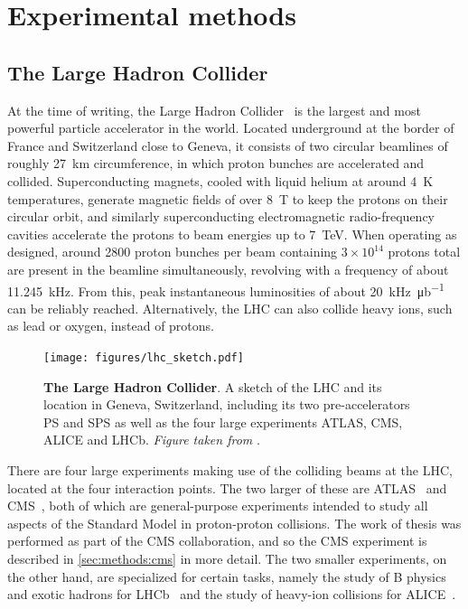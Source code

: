 \chapter{Experimental methods}
\label{ch:methods}

\section{The Large Hadron Collider}

At the time of writing, the Large Hadron Collider~\cite{Bruning:2004ej} is the largest and most powerful particle accelerator in the world. Located underground at the border of France and Switzerland close to Geneva, it consists of two circular beamlines of roughly 27~km circumference, in which proton bunches are accelerated and collided. Superconducting magnets, cooled with liquid helium at around 4~K temperatures, generate magnetic fields of over 8~T to keep the protons on their circular orbit, and similarly superconducting electromagnetic radio-frequency cavities accelerate the protons to beam energies up to 7~TeV. When operating as designed, around 2800 proton bunches per beam containing $3\times10^{14}$ protons total are present in the beamline simultaneously, revolving with a frequency of about 11.245~kHz. From this, peak instantaneous luminosities of about \SI{20}{\kilo\hertz\per\micro\barn} can be reliably reached. Alternatively, the LHC can also collide heavy ions, such as lead or oxygen, instead of protons.

\begin{figure}[!t]
    \centering
    \texttt{[image: figures/lhc\_sketch.pdf]}
    \caption{\textbf{The Large Hadron Collider}. A sketch of the LHC and its location in Geneva, Switzerland, including its two pre-accelerators PS and SPS as well as the four large experiments ATLAS, CMS, ALICE and LHCb. \textit{Figure taken from }.}
\end{figure}

There are four large experiments making use of the colliding beams at the LHC, located at the four interaction points. The two larger of these are ATLAS~\cite{ATLAS:2008xda} and CMS~\cite{CMS:2008xjf}, both of which are general-purpose experiments intended to study all aspects of the Standard Model in proton-proton collisions. The work of thesis was performed as part of the CMS collaboration, and so the CMS experiment is described in \cref{sec:methods:cms} in more detail. The two smaller experiments, on the other hand, are specialized for certain tasks, namely the study of B physics and exotic hadrons for LHCb~\cite{LHCb:2008vvz} and the study of heavy-ion collisions for ALICE~\cite{ALICE:2008ngc}.

